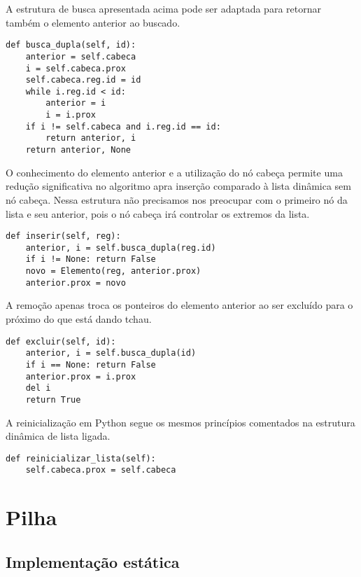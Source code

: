 \documentclass[a4paper, twocolumn]{article}
\theoremstyle{definition}
\begin{document}
A estrutura de busca apresentada acima pode ser adaptada para retornar também o elemento anterior ao buscado.
\begin{lstlisting}[label=lista_ligada_circ_busca_dupla, caption= Lista Ligada circular (busca anterior e atual)]
def busca_dupla(self, id):
    anterior = self.cabeca
    i = self.cabeca.prox
    self.cabeca.reg.id = id
    while i.reg.id < id:
        anterior = i
        i = i.prox
    if i != self.cabeca and i.reg.id == id: 
        return anterior, i
    return anterior, None
\end{lstlisting}

O conhecimento do elemento anterior e a utilização do nó cabeça permite uma redução significativa no algoritmo apra inserção comparado à lista dinâmica sem nó cabeça. Nessa estrutura não precisamos nos preocupar com o primeiro nó da lista e seu anterior, pois o nó cabeça irá controlar os extremos da lista.
\begin{lstlisting}[label=lista_ligada_circ_inserir, caption= Lista Ligada circular (inserção)]
def inserir(self, reg):
    anterior, i = self.busca_dupla(reg.id)
    if i != None: return False
    novo = Elemento(reg, anterior.prox)
    anterior.prox = novo
\end{lstlisting}

A remoção apenas troca os ponteiros do elemento anterior ao ser excluído para o próximo do que está dando tchau.
\begin{lstlisting}[label=lista_ligada_circ_excluir, caption= Lista Ligada circular (remoção)]
def excluir(self, id):
    anterior, i = self.busca_dupla(id)
    if i == None: return False
    anterior.prox = i.prox
    del i
    return True
\end{lstlisting}

A reinicialização em Python segue os mesmos princípios comentados na estrutura dinâmica de lista ligada.
\begin{lstlisting}[label=lista_ligada_circ_reinicializar, caption= Lista Ligada circular (reinicialização)]
def reinicializar_lista(self):
    self.cabeca.prox = self.cabeca
\end{lstlisting}

\section{Pilha}

\subsection{Implementação estática}
\end{document}
